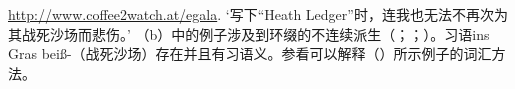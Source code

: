 \begin{exe}
\begin{xlist}[iv.]
\begin{exe}
\begin{xlist}[iv.]
{\url{http://www.coffee2watch.at/egala}.  
}
\glt `写下“Heath Ledger”时，连我也无法不再次为其战死沙场而悲伤。'
\zl
（b）中的例子涉及到环缀\gee 的不连续派生（\citealp[\S~3.4.3]{Luedeling2001a}；\citealp[--327, 372--377]{Mueller2002b}；\citealp[\S~2.2.1, \S~5.2.1]{Mueller2003a}）。习语ins Gras beiß-（战死沙场）存在并且有习语义。参看可以解释（）所示例子的词汇方法。





\end{xlist}
\end{exe}
\end{xlist}
\end{exe}
